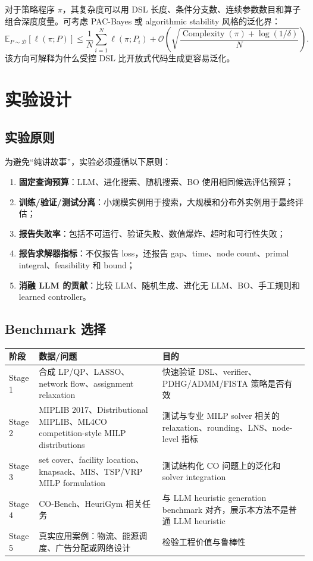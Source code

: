 \documentclass[UTF8,a4paper,12pt,fontset=fandol]{ctexart}
\begin{document}
对于策略程序 $\pi$，其复杂度可以用 DSL 长度、条件分支数、连续参数数目和算子组合深度度量。可考虑 PAC-Bayes 或 algorithmic stability 风格的泛化界：
\begin{equation}
\mathbb{E}_{P\sim\mathcal{D}}\left[\ell(\pi;P)\right]
\le
\frac{1}{N}\sum_{i=1}^N \ell(\pi;P_i)
+
\mathcal{O}\left(
\sqrt{\frac{\operatorname{Complexity}(\pi)+\log(1/\delta)}{N}}
\right).
\end{equation}
该方向可解释为什么受控 DSL 比开放式代码生成更容易泛化。

\section{实验设计}

\subsection{实验原则}

为避免“纯讲故事”，实验必须遵循以下原则：
\begin{enumerate}[leftmargin=2em]
    \item \textbf{固定查询预算}：LLM、进化搜索、随机搜索、BO 使用相同候选评估预算；
    \item \textbf{训练/验证/测试分离}：小规模实例用于搜索，大规模和分布外实例用于最终评估；
    \item \textbf{报告失败率}：包括不可运行、验证失败、数值爆炸、超时和可行性失败；
    \item \textbf{报告求解器指标}：不仅报告 loss，还报告 gap、time、node count、primal integral、feasibility 和 bound；
    \item \textbf{消融 LLM 的贡献}：比较 LLM、随机生成、进化无 LLM、BO、手工规则和 learned controller。
\end{enumerate}

\subsection{Benchmark 选择}

\begin{longtable}{p{3.2cm}p{4.6cm}p{5.2cm}}
\toprule
阶段 & 数据/问题 & 目的 \\
\midrule
Stage 1 & 合成 LP/QP、LASSO、network flow、assignment relaxation & 快速验证 DSL、verifier、PDHG/ADMM/FISTA 策略是否有效 \\
Stage 2 & MIPLIB 2017、Distributional MIPLIB、ML4CO competition-style MILP distributions & 测试与专业 MILP solver 相关的 relaxation、rounding、LNS、node-level 指标 \\
Stage 3 & set cover、facility location、knapsack、MIS、TSP/VRP MILP formulation & 测试结构化 CO 问题上的泛化和 solver integration \\
Stage 4 & CO-Bench、HeuriGym 相关任务 & 与 LLM heuristic generation benchmark 对齐，展示本方法不是普通 LLM heuristic \\
Stage 5 & 真实应用案例：物流、能源调度、广告分配或网络设计 & 检验工程价值与鲁棒性 \\
\bottomrule
\end{longtable}
\end{document}
